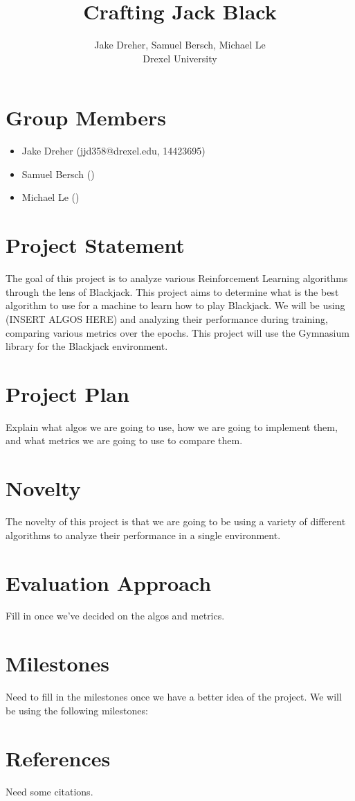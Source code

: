\documentclass[letterpaper]{article}
\begin{document}
 \title{Crafting Jack Black}
\author{Jake Dreher, Samuel Bersch, Michael Le\\
Drexel University
}
\maketitle

 \section*{Group Members}
 \begin{itemize}
	 \item Jake Dreher (jjd358@drexel.edu, 14423695)
	 \item Samuel Bersch ()%
	 \item Michael Le ()%
 \end{itemize}

 \section*{Project Statement}
 The goal of this project is to analyze various Reinforcement Learning algorithms through the lens of Blackjack. This project aims to determine what is the best algorithm to use for a machine to learn how to play Blackjack. We will be using (INSERT ALGOS HERE) and analyzing their performance during training, comparing various metrics over the epochs. This project will use the Gymnasium library for the Blackjack environment.

 \section*{Project Plan}
 Explain what algos we are going to use, how we are going to implement them, and what metrics we are going to use to compare them.

 \section*{Novelty}
 The novelty of this project is that we are going to be using a variety of different algorithms to analyze their performance in a single environment.

 \section*{Evaluation Approach}
 Fill in once we've decided on the algos and metrics.

 \section*{Milestones}
 Need to fill in the milestones once we have a better idea of the project. We will be using the following milestones:

 \section*{References}
 Need some citations.
\end{document}
